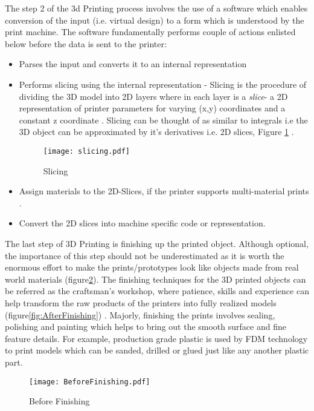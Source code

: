 The step 2 of the 3d Printing process involves the use of a software which enables conversion of the input (i.e. virtual design) to a form which is understood by the print machine. The software fundamentally performs couple of actions enlisted below before the data is sent to the printer:
\begin{itemize}
\item Parses the input and converts it to an internal representation
\item Performs slicing using the internal representation - Slicing is the procedure of dividing the 3D model into 2D layers where in each layer is a \textit{slice}- a 2D representation of printer parameters for varying (x,y) coordinates and a constant z coordinate . Slicing can be thought of as similar to integrals i.e the 3D object can be approximated by it's derivatives i.e. 2D slices, Figure \ref{fig:slic} \cite{slicing}.
\begin{figure}[ht!]
\centering
\texttt{[image: slicing.pdf]}
\caption{Slicing}
\label{fig:slic}
\end{figure}

\item Assign materials to the 2D-Slices, if the printer supports multi-material prints . 
\item Convert the 2D slices into machine specific code or representation.
\end{itemize}

The last step of 3D Printing is finishing up the printed object. Although optional, the importance of this step should not be underestimated as it is worth the enormous effort to make the prints/prototypes look like objects made from real world materials (figure\ref{fig:BeforeFinishing}). The finishing techniques for the 3D printed objects can be referred as the craftsman's workshop, where patience, skills and experience can help transform the raw products of the printers into fully realized models (figure\ref{fig:AfterFinishing}) . Majorly, finishing the prints involves sealing, polishing and painting which helps to bring out the smooth surface and fine feature details. For example, production grade plastic is used by FDM technology to print models which can be sanded, drilled or glued just like any another plastic part. 

\begin{figure}[ht!]
\centering
\texttt{[image: BeforeFinishing.pdf]}
\caption{Before Finishing}
\label{fig:BeforeFinishing}
\end{figure}

